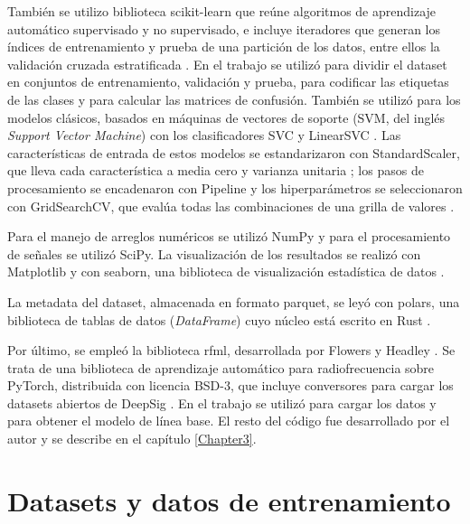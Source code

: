 También se utilizo biblioteca scikit-learn que reúne algoritmos de aprendizaje automático supervisado y no supervisado, e incluye iteradores que generan los índices de entrenamiento y prueba de una partición de los datos, entre ellos la validación cruzada estratificada \cite{pedregosa2011scikit}. En el trabajo se utilizó para dividir el dataset en conjuntos de entrenamiento, validación y prueba, para codificar las etiquetas de las clases y para calcular las matrices de confusión. También se utilizó para los modelos clásicos, basados en máquinas de vectores de soporte (SVM, del inglés \textit{Support Vector Machine}) con los clasificadores SVC y LinearSVC \cite{sklearn2026docs}. Las características de entrada de estos modelos se estandarizaron con StandardScaler, que lleva cada característica a media cero y varianza unitaria \cite{sklearn2026docs}; los pasos de procesamiento se encadenaron con Pipeline \cite{pedregosa2011scikit,sklearn2026docs} y los hiperparámetros se seleccionaron con GridSearchCV, que evalúa todas las combinaciones de una grilla de valores \cite{pedregosa2011scikit,sklearn2026docs}.

Para el manejo de arreglos numéricos se utilizó NumPy y para el procesamiento de señales se utilizó SciPy. La visualización de los resultados se realizó con Matplotlib y con seaborn, una biblioteca de visualización estadística de datos \cite{waskom2021seaborn}.

La metadata del dataset, almacenada en formato parquet, se leyó con polars, una biblioteca de tablas de datos (\textit{DataFrame}) cuyo núcleo está escrito en Rust \cite{polars2026docs}.

Por último, se empleó la biblioteca rfml, desarrollada por Flowers y Headley \cite{flowers2019rfml}. Se trata de una biblioteca de aprendizaje automático para radiofrecuencia sobre PyTorch, distribuida con licencia BSD-3, que incluye conversores para cargar los datasets abiertos de DeepSig \cite{flowers2019rfml}. En el trabajo se utilizó para cargar los datos y para obtener el modelo de línea base. El resto del código fue desarrollado por el autor y se describe en el capítulo \ref{Chapter3}.


\section{Datasets y datos de entrenamiento}
\label{sec:datasets}

